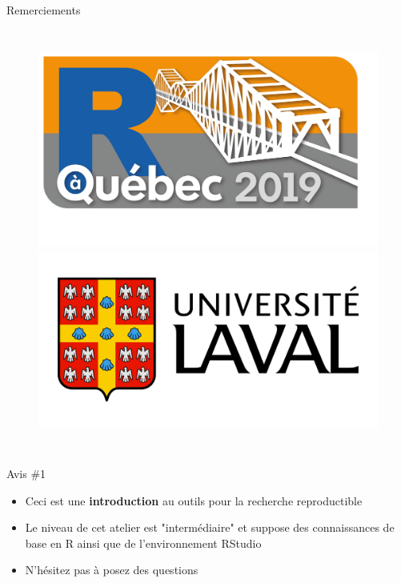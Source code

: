 \documentclass[10pt]{beamer}\usepackage[]{graphicx}\usepackage[]{color}
\begin{document}
\begin{frame}{Remerciements}
\begin{columns}[c]
\begin{figure}
\includegraphics[width=1.0\columnwidth]{logo_r_a_quebec_2019_presente_par_ia_blanc.png}\\[5mm]
\includegraphics[width=1.0\columnwidth]{ulaval-logo.jpg}
\end{figure}

\end{columns}
\end{frame}


\begin{frame}{Avis \#1}
\begin{itemize}
	\item Ceci est une \textbf{introduction} au outils pour la recherche reproductible
	\pause \item Le niveau de cet atelier est "intermédiaire" et suppose des connaissances de base en R ainsi que de l'environnement RStudio
	\pause \item N'h\'{e}sitez pas \`{a} posez des questions
\end{itemize}
\end{frame}
\end{document}
